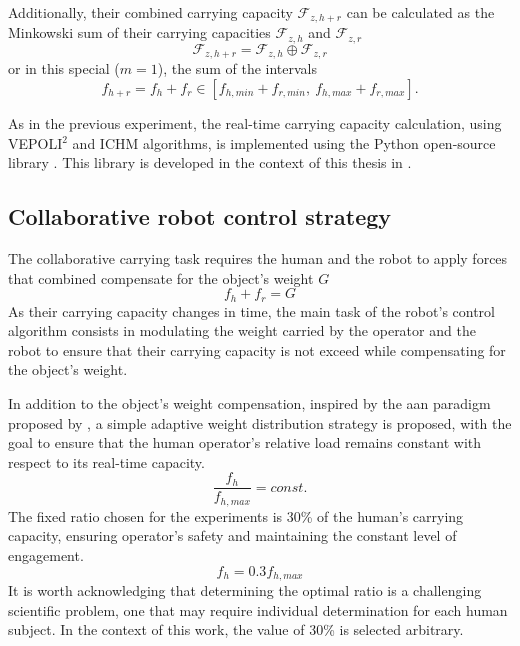 Additionally, their combined carrying capacity $\mathcal{F}_{z,h+r}$ can be calculated as the Minkowski sum of their carrying capacities $\mathcal{F}_{z,h}$ and $\mathcal{F}_{z,r}$ 
$$\mathcal{F}_{z,h+r} = \mathcal{F}_{z,h}\oplus \mathcal{F}_{z,r}$$
or in this special ($m=1$), the sum of the intervals 
$$f_{h+r} = f_{h}+f_{r} \in  [f_{h,min} + f_{r,min}, ~f_{h,max} + f_{r,max}].$$

As in the previous experiment, the real-time carrying capacity calculation, using VEPOLI$^2$ and ICHM algorithms, is implemented using the Python open-source library . This library is developed in the context of this thesis in .

\subsection{Collaborative robot control strategy}
\label{sec:collab_robot_control_human_robot}

The collaborative carrying task requires the human and the robot to apply forces that combined compensate for the object's weight $G$ 
$$f_{h} + f_{r} = G$$
As their carrying capacity changes in time, the main task of the robot's control algorithm consists in modulating the weight carried by the operator and the robot to ensure that their carrying capacity is not exceed while compensating for the object's weight.

In addition to the object's weight compensation, inspired by the \gls{aan} paradigm proposed by 
\citet{carmichael2013admittance}, a simple adaptive weight distribution strategy is proposed, with the goal to ensure that the human operator's relative load remains constant with respect to its real-time capacity. 
$$\frac{f_h}{f_{h,max}} = const.$$
The fixed ratio chosen for the experiments is 30\% of the human's carrying capacity, ensuring operator's safety and maintaining the constant level of engagement.  
$$
f_h = 0.3 f_{h,max}
$$ 
It is worth acknowledging that determining the optimal ratio is a challenging scientific problem, one that may require individual determination for each human subject. In the context of this work, the value of 30\% is selected arbitrary.

